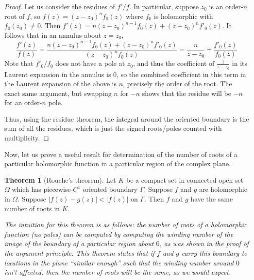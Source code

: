 \documentclass[aps,pra,showpacs,notitlepage,onecolumn,superscriptaddress,nofootinbib]{revtex4-1}
\theoremstyle{definition}
\newtheorem{theorem}{Theorem}[section]
\begin{document}
\begin{proof}
  Let us consider the residues of $f'/f$. In particular, suppose $z_0$ is an order-$n$ root of $f$, so $f(z) = (z - z_0)^{n} f_0(z)$ where $f_0$ is holomorphic with $f_0(z_0) \neq 0$.
  Then $f'(z) = n (z - z_0)^{n - 1} f_0(z) + (z - z_0)^{n} f'_0(z)$. It follows that in an annulus about $z = z_0$,
  \begin{equation}
    \frac{f'(z)}{f(z)} = \frac{n (z - z_0)^{n - 1} f_0(z) + (z - z_0)^{n} f'_0(z)}{(z - z_0)^{n} f_0(z)} = \frac{n}{z - z_0} + \frac{f'_0(z)}{f_0(z)}
  \end{equation}
  Note that $f'_0/f_0$ does not have a pole at $z_0$, and thus the coefficient of $\frac{1}{z - z_0}$ in its Laurent expansion in the annulus is $0$, so the combined
  coefficient in this term in the Laurent expansion of the above is $n$, precisely the order of the root. The exact same argument, but swapping $n$ for $-n$ shows that
  the residue will be $-n$ for an order-$n$ pole.
  \newline

  \noindent Thus, using the residue theorem, the integral around the oriented boundary is the sum of all the residues, which is just the signed roots/poles counted with multiplicity.
  \end{proof}

\noindent Now, let us prove a useful result for determination of the number of roots of a particular holomorphic function in a particular region of the complex plane.

\begin{theorem}[Rouche's theorem]
  Let $K$ be a compact set in connected open set $\Omega$ which has piecewise-$C^1$ oriented boundary $\Gamma$. Suppose $f$ and $g$ are holomorphic in $\Omega$.
  Suppose $|f(z) - g(z)| < |f(z)|$ on $\Gamma$. Then $f$ and $g$ have the same number of roots in $K$.
\end{theorem}

\noindent \emph{The intuition for this theorem is as follows: the number of roots of a holomorphic function (no poles) can be computed by computing the winding number
of the image of the boundary of a particular region about $0$, as was shown in the proof of the argument principle. This theorem states that if $f$ and $g$ carry
this boundary to locations in the plane ``similar enough'' such that the winding number around $0$ isn't affected, then the number of roots will be the same, as we would expect.}
\newline
\end{document}
